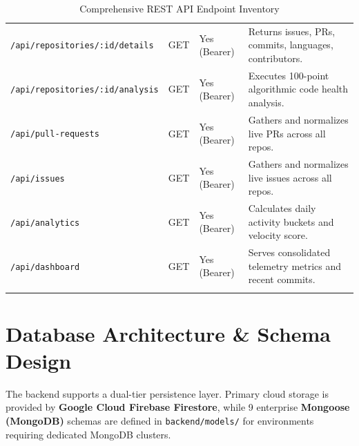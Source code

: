 \documentclass[11pt,a4paper]{article}
\begin{document}
\begin{longtable}{p{4.2cm} l p{2.2cm} X}
\texttt{/api/repositories/:id/details} & GET & Yes (Bearer) & Returns issues, PRs, commits, languages, contributors. \\
\texttt{/api/repositories/:id/analysis} & GET & Yes (Bearer) & Executes 100-point algorithmic code health analysis. \\
\texttt{/api/pull-requests} & GET & Yes (Bearer) & Gathers and normalizes live PRs across all repos. \\
\texttt{/api/issues} & GET & Yes (Bearer) & Gathers and normalizes live issues across all repos. \\
\texttt{/api/analytics} & GET & Yes (Bearer) & Calculates daily activity buckets and velocity score. \\
\texttt{/api/dashboard} & GET & Yes (Bearer) & Serves consolidated telemetry metrics and recent commits. \\
\bottomrule
\caption{Comprehensive REST API Endpoint Inventory}
\end{longtable}

\section{Database Architecture \& Schema Design}

The backend supports a dual-tier persistence layer. Primary cloud storage is provided by \textbf{Google Cloud Firebase Firestore}, while 9 enterprise \textbf{Mongoose (MongoDB)} schemas are defined in \texttt{backend/models/} for environments requiring dedicated MongoDB clusters.
\end{document}
